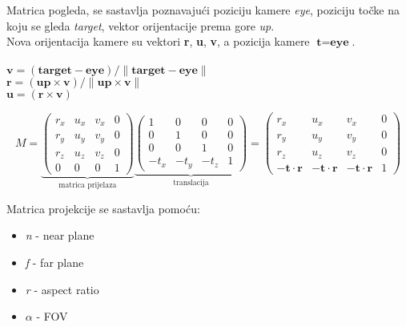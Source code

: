 Matrica pogleda, se sastavlja poznavajući poziciju kamere \emph{eye}, poziciju točke na koju se gleda \emph{target}, vektor orijentacije prema gore \emph{up}.\\

Nova orijentacija kamere su vektori \textbf{r}, \textbf{u}, \textbf{v}, a pozicija kamere $\textbf{t} = \textbf{eye}$.\\\\
$\textbf{v} = (\textbf{target} - \textbf{eye})/\| \textbf{target} - \textbf{eye} \|$\\
$\textbf{r} = (\textbf{up} \times \textbf{v})/\| \textbf{up} \times \textbf{v} \|$\\
$\textbf{u} = (\textbf{r} \times \textbf{v})$

\[
M = 
\underbrace{
		\begin{pmatrix}
		r_x & u_x & v_x & 0\\
		r_y & u_y & v_y & 0\\
		r_z & u_z & v_z & 0\\
		0 & 0 & 0 & 1
		\end{pmatrix}
	}_\text{matrica prijelaza}
\underbrace{
		\begin{pmatrix}
		1 & 0 & 0 & 0\\
		0 & 1 & 0 & 0\\
		0 & 0 & 1 & 0\\
		-t_x & -t_y & -t_z & 1
		\end{pmatrix}
	}_\text{translacija}
=
\begin{pmatrix}
r_x & u_x & v_x & 0\\
r_y & u_y & v_y & 0\\
r_z & u_z & v_z & 0\\
-\textbf{t} \cdot \textbf{r} & -\textbf{t} \cdot \textbf{r} & -\textbf{t} \cdot \textbf{r} & 1
\end{pmatrix}
\]

\begin{codesection}
	
\end{codesection}

Matrica projekcije se sastavlja pomoću:
\begin{itemize}
	\item \emph{n} - near plane
	\item \emph{f} - far plane
	\item \emph{r} - aspect ratio
	\item \emph{$\alpha$} - FOV
\end{itemize}

